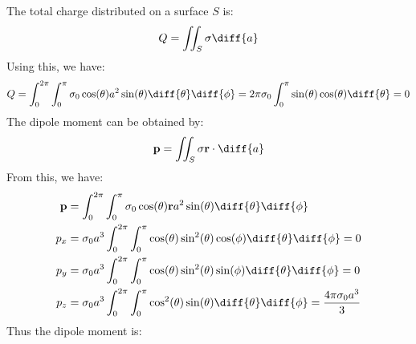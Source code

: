 \documentclass[crop=false,class=book,oneside]{standalone}
\begin{document}
            \begin{solution}
                The total charge distributed on a surface $S$ is:
                \begin{equation}
                    Q=\iint_{S}\sigma\diff{a}
                \end{equation}
                Using this, we have:
                \begin{equation}
                    Q=\int_{0}^{2\pi}\int_{0}^{\pi}
                    \sigma_{0}\cos(\theta)a^{2}\sin(\theta)
                    \diff{\theta}\diff{\phi}
                    =2\pi\sigma_{0}\int_{0}^{\pi}
                    \sin(\theta)\cos(\theta)\diff{\theta}
                    =0
                \end{equation}
                The dipole moment can be obtained by:
                \begin{equation}
                    \mathbf{p}=\iint_{S}\sigma\mathbf{r}\cdot\diff{a}
                \end{equation}
                From this, we have:
                \begin{subequations}
                    \begin{align}
                        \mathbf{p}&=
                        \int_{0}^{2\pi}\int_{0}^{\pi}
                        \sigma_{0}\cos(\theta)
                            \mathbf{r}a^{2}\sin(\theta)
                            \diff{\theta}\diff{\phi}\\
                        p_{x}&=
                        \sigma_{0}a^{3}\int_{0}^{2\pi}\int_{0}^{\pi}
                            \cos(\theta)\sin^{2}(\theta)\cos(\phi)
                            \diff{\theta}\diff{\phi}=0\\
                        p_{y}&=\sigma_{0}a^{3}
                            \int_{0}^{2\pi}\int_{0}^{\pi}
                            \cos(\theta)\sin^{2}(\theta)\sin(\phi)
                            \diff{\theta}\diff{\phi}=0\\
                        p_{z}&=\sigma_{0}a^{3}
                            \int_{0}^{2\pi}\int_{0}^{\pi}
                            \cos^{2}(\theta)\sin(\theta)
                            \diff{\theta}\diff{\phi}
                            =\frac{4\pi\sigma_{0}a^{3}}{3}
                    \end{align}
                \end{subequations}
                Thus the dipole moment is:
                \begin{equation}

\end{equation}
\end{solution}
\end{document}
